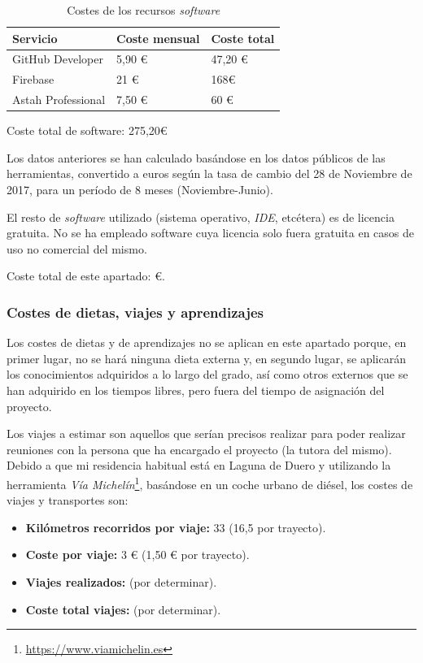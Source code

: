 \documentclass[twoside]{report}
\begin{document}
\begin{table}[H]
\centering
\begin{tabular}{|l|l|l|}
\hline
Servicio         & Coste mensual & Coste total \\ \hline
GitHub Developer & 5,90 \euro        & 47,20 \euro          \\ \hline
Firebase         & 21 \euro      & 168\euro           \\ \hline
Astah Professional & 7,50 \euro & 60 \euro \\ \hline
\end{tabular}
\caption{Costes de los recursos \textit{software}}
\end{table}

Coste total de software: 275,20\euro

Los datos anteriores se han calculado basándose en los datos públicos de las herramientas, convertido a euros según la tasa de cambio del 28 de Noviembre de 2017, para un período de 8 meses (Noviembre-Junio).

El resto de \textit{software} utilizado (sistema operativo, \textit{IDE}, etcétera) es de licencia gratuita. No se ha empleado software cuya licencia solo fuera gratuita en casos de uso no comercial del mismo.

Coste total de este apartado: \euro .

\subsubsection{Costes de dietas, viajes y aprendizajes}

Los costes de dietas y de aprendizajes no se aplican en este apartado porque, en primer lugar, no se hará ninguna dieta externa y, en segundo lugar, se aplicarán los conocimientos adquiridos a lo largo del grado, así como otros externos que se han adquirido en los tiempos libres, pero fuera del tiempo de asignación del proyecto.

Los viajes a estimar son aquellos que serían precisos realizar para poder realizar reuniones con la persona que ha encargado el proyecto (la tutora del mismo). Debido a que mi residencia habitual está en Laguna de Duero y utilizando la herramienta \textit{Vía Michelín}\footnote{\url{https://www.viamichelin.es}}, basándose en un coche urbano de diésel, los costes de viajes y transportes son:

\begin{itemize}
\item \textbf{Kilómetros recorridos por viaje:} 33 (16,5 por trayecto).
\item \textbf{Coste por viaje:} 3 \euro \hspace{0.1cm} (1,50 \euro \hspace{0.1cm} por trayecto).
\item \textbf{Viajes realizados:} (por determinar).
\item \textbf{Coste total viajes:} (por determinar).
\end{itemize}
\end{document}
